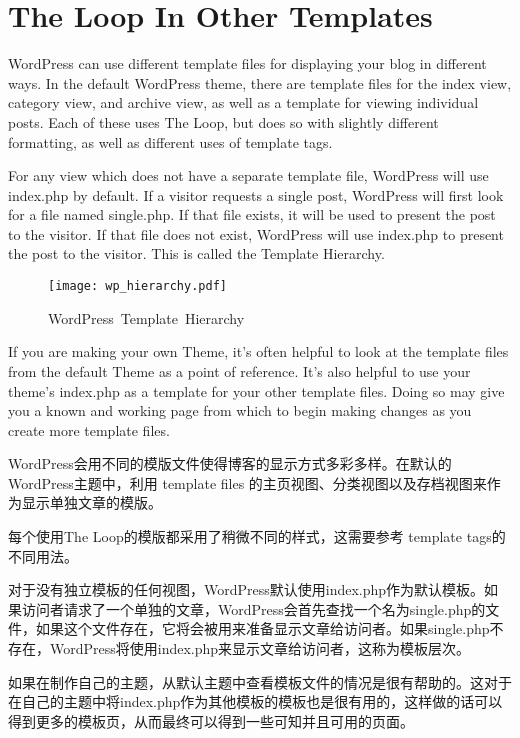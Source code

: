 \chapter{The Loop In Other Templates}

WordPress can use different template files for displaying your blog in different ways. In the default WordPress theme, there are template files for the index view, category view, and archive view, as well as a template for viewing individual posts. Each of these uses The Loop, but does so with slightly different formatting, as well as different uses of template tags.

For any view which does not have a separate template file, WordPress will use index.php by default. If a visitor requests a single post, WordPress will first look for a file named single.php. If that file exists, it will be used to present the post to the visitor. If that file does not exist, WordPress will use index.php to present the post to the visitor. This is called the Template Hierarchy.

\begin{figure}[!ht]
\centering
\texttt{[image: wp\_hierarchy.pdf]}
\caption{WordPress~Template~Hierarchy}
\end{figure}

If you are making your own Theme, it's often helpful to look at the template files from the default Theme as a point of reference. It's also helpful to use your theme's index.php as a template for your other template files. Doing so may give you a known and working page from which to begin making changes as you create more template files.

WordPress会用不同的模版文件使得博客的显示方式多彩多样。在默认的WordPress主题中，利用 template files 的主页视图、分类视图以及存档视图来作为显示单独文章的模版。 

每个使用The Loop的模版都采用了稍微不同的样式，这需要参考 template tags的不同用法。


对于没有独立模板的任何视图，WordPress默认使用index.php作为默认模板。如果访问者请求了一个单独的文章，WordPress会首先查找一个名为single.php的文件，如果这个文件存在，它将会被用来准备显示文章给访问者。如果single.php不存在，WordPress将使用index.php来显示文章给访问者，这称为模板层次。







如果在制作自己的主题，从默认主题中查看模板文件的情况是很有帮助的。这对于在自己的主题中将index.php作为其他模板的模板也是很有用的，这样做的话可以得到更多的模板页，从而最终可以得到一些可知并且可用的页面。


